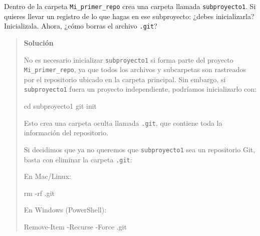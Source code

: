 \documentclass[
  spanish,
  12pt,
  letterpaper,
  DIV=11,
  numbers=noendperiod]{scrreprt}
\newenvironment{Shaded}{\begin{snugshade}}{\end{snugshade}}
\newcommand{\AttributeTok}[1]{\textcolor[rgb]{0.40,0.45,0.13}{#1}}
\newcommand{\BuiltInTok}[1]{\textcolor[rgb]{0.00,0.23,0.31}{#1}}
\newcommand{\FunctionTok}[1]{\textcolor[rgb]{0.28,0.35,0.67}{#1}}
\newcommand{\NormalTok}[1]{\textcolor[rgb]{0.00,0.23,0.31}{#1}}
\newcommand{\OperatorTok}[1]{\textcolor[rgb]{0.37,0.37,0.37}{#1}}
\begin{document}
\begin{tcolorbox}[enhanced jigsaw, arc=.35mm, bottomrule=.15mm, bottomtitle=1mm, breakable, colback=white, colbacktitle=quarto-callout-note-color!10!white, colframe=quarto-callout-note-color-frame, coltitle=black, left=2mm, leftrule=.75mm, opacityback=0, opacitybacktitle=0.6, rightrule=.15mm, title=\textcolor{quarto-callout-note-color}{\faInfo}\hspace{0.5em}{Ejercicio 1}, titlerule=0mm, toprule=.15mm, toptitle=1mm]

Dentro de la carpeta \texttt{Mi\_primer\_repo} crea una carpeta llamada
\texttt{subproyecto1}. Si quieres llevar un registro de lo que hagas en
ese subproyecto: ¿debes inicializarla? Inicializala. Ahora, ¿cómo borras
el archivo \texttt{.git}?

\begin{quote}
\textbf{Solución}

No es necesario inicializar \texttt{subproyecto1} si forma parte del
proyecto \texttt{Mi\_primer\_repo}, ya que todos los archivos y
subcarpetas son rastreados por el repositorio ubicado en la carpeta
principal. Sin embargo, si \texttt{subproyecto1} fuera un proyecto
independiente, podríamos inicializarlo con:

\begin{Shaded}
\begin{Highlighting}[]
\BuiltInTok{cd}\NormalTok{ subproyecto1}
\FunctionTok{git}\NormalTok{ init}
\end{Highlighting}
\end{Shaded}

Esto crea una carpeta oculta llamada \texttt{.git}, que contiene toda la
información del repositorio.

Si decidimos que ya no queremos que \texttt{subproyecto1} sea un
repositorio Git, basta con eliminar la carpeta \texttt{.git}:

En Mac/Linux:

\begin{Shaded}
\begin{Highlighting}[]
\FunctionTok{rm} \AttributeTok{{-}rf}\NormalTok{ .git}
\end{Highlighting}
\end{Shaded}

En Windows (PowerShell):

\begin{Shaded}
\begin{Highlighting}[]
\FunctionTok{Remove{-}Item} \OperatorTok{{-}}\NormalTok{Recurse }\OperatorTok{{-}}\NormalTok{Force }\OperatorTok{.}\FunctionTok{git}
\end{Highlighting}
\end{Shaded}


\end{quote}
\end{tcolorbox}
\end{document}
